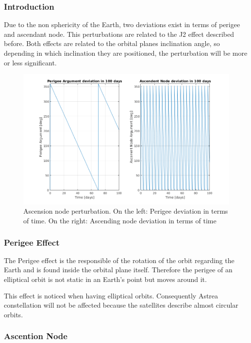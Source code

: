 \subsubsection{Introduction}

Due to the non sphericity of the Earth, two deviations exist in terms of perigee and ascendant node. This perturbations are related to the J2 effect described before.
Both effects are related to the orbital planes inclination angle, so depending in which inclination they are positioned, the perturbation will be more or less  significant.

\begin{figure}[H] %
	\centering
	\includegraphics[width=.8\textwidth]{./decay/Inclination.png}
	\caption[Ascension node perturbation]{Ascension node perturbation. On the left: Perigee deviation in terms of time. On the right: Ascending node deviation in terms of time}
	\label{fig:Inclination} 
\end{figure}

\subsubsection{Perigee Effect}
The Perigee effect is the responsible of the rotation of the orbit regarding the Earth and is found inside the orbital plane itself. Therefore the perigee of an elliptical orbit is not static in an Earth's point but moves around it. 

This effect is noticed when having elliptical orbits. Consequently Astrea constellation will not be affected because the satellites describe almost circular orbits.

\subsubsection{Ascention Node}

